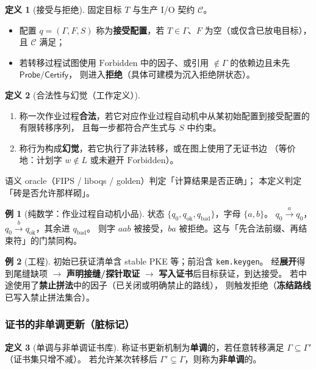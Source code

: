 \documentclass[UTF8,a4paper,11pt]{ctexart}
\theoremstyle{definition}
\newtheorem{definition}{定义}[section]
\newtheorem{example}{例}[section]
\theoremstyle{plain}
\theoremstyle{remark}
\numberwithin{figure}{section}
\numberwithin{table}{section}
\begin{document}
\begin{definition}[接受与拒绝]
固定目标 $T$ 与生产 I/O 契约 $\mathcal{C}$。
\begin{itemize}
  \item 配置 $q=(\Gamma,F,S)$ 称为\textbf{接受配置}，若 $T\in\Gamma$、$F$ 为空（或仅含已放电目标），且 $\mathcal{C}$ 满足；
  \item 若转移过程试图使用 $\mathrm{Forbidden}$ 中的因子、或引用 $\notin\Gamma$ 的依赖边且未先 $\mathsf{Probe}/\mathsf{Certify}$，
        则进入\textbf{拒绝}（具体可建模为沉入拒绝阱状态）。
\end{itemize}
\end{definition}

\begin{definition}[合法性与幻觉（工作定义）]
\begin{enumerate}
  \item 称一次作业过程\textbf{合法}，若它对应作业过程自动机中从某初始配置到接受配置的有限转移序列，
        且每一步都符合产生式与 $S$ 中约束。
  \item 称行为构成\textbf{幻觉}，若它执行了非法转移，或在图上使用了无证书边
        （等价地：计划字 $w\notin L$ 或未避开 $\mathrm{Forbidden}$）。
\end{enumerate}
语义 oracle（FIPS / liboqs / golden）判定「计算结果是否正确」；
本定义判定「砖是否允许那样砌」。
\end{definition}

\begin{example}[纯数学：作业过程自动机小品]
状态 $\{q_0,q_{\mathrm{ok}},q_{\mathrm{bad}}\}$，字母 $\{a,b\}$。
$q_0\xrightarrow{a}q_0$，$q_0\xrightarrow{b}q_{\mathrm{ok}}$，其余进 $q_{\mathrm{bad}}$。
则字 $aab$ 被接受，$ba$ 被拒绝。这与「先合法前缀、再结束符」的门禁同构。
\end{example}

\begin{example}[工程]
初始已获证清单含 stable PKE 等；前沿含 \texttt{kem.keygen}。
经\textbf{展开}得到尾缝缺项 $\to$ \textbf{声明接缝/探针取证} $\to$ \textbf{写入证书}后目标获证，到达接受。
若中途使用了\textbf{禁止拼法}中的因子（已关闭或明确禁止的路线），
则触发拒绝（\textbf{冻结路线}已写入禁止拼法集合）。
\end{example}

\subsubsection{证书的非单调更新（脏标记）}
\label{sec:dirty}

\begin{definition}[单调与非单调证书库]
称证书更新机制为\textbf{单调}的，若任意转移满足 $\Gamma\subseteq\Gamma'$（证书集只增不减）。
若允许某次转移后 $\Gamma'\subsetneq\Gamma$，则称为\textbf{非单调}的。
\end{definition}
\end{document}
